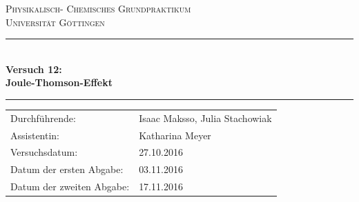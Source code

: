 \documentclass[a4paper,12pt,oneside,onecolum,final,openany]{report}
\begin{document}
\begin{titlepage}
\centering
\textsc{\Large Physikalisch- Chemisches Grundpraktikum\\[1.5ex] Universität Göttingen}

\vspace*{0.5cm}

\rule{\textwidth}{1pt}\\[0.5cm]
{\huge \bfseries
  Versuch 12: \\[1.5ex]
  Joule-Thomson-Effekt}\\[0.5cm]
\rule{\textwidth}{1pt}

\vspace*{0.5cm}


\begin{Large}
\begin{tabular}{ll}
Durchführende: &  Isaac Maksso, Julia Stachowiak\\
Assistentin: & Katharina Meyer \\
 Versuchsdatum: & 27.10.2016\\
 Datum der ersten Abgabe: & 03.11.2016\\
 Datum der zweiten Abgabe: & 17.11.2016\\
\end{tabular}
\end{Large}

\vspace*{0.5cm}

 

\end{titlepage}
\end{document}
